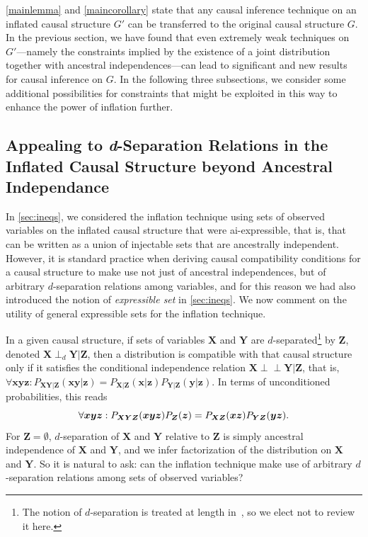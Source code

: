 \documentclass[aps,english,10pt,superscriptaddress,onecolumn,twoside,longbibliography,pra,floatfix,fleqn,nofootinbib]{revtex4-1}
\theoremstyle{definition}
\newcommand{\p}[2][]{{P_{#1}}\parenths{#2}}
\newcommand{\indep}{\perp\!\!\!\!\perp}
\DeclarePairedDelimiter{\parenths}{\lparen}{\rparen}
\begin{document}
\cref{mainlemma} and \cref{maincorollary} state that any causal inference technique on an inflated causal structure $G'$ can be transferred to the original causal structure $G$. In the previous section, we have found that even extremely weak techniques on $G'$---namely the constraints implied by the existence of a joint distribution together with ancestral independences---can lead to significant and new results for causal inference on $G$. In the following three subsections, we consider some additional possibilities for constraints that might be exploited in this way to enhance the power of inflation further.

\subsection{Appealing to \textit{d}-Separation Relations in the Inflated Causal Structure beyond Ancestral Independance}\label{sec:fulldsep}

In \cref{sec:ineqs}, we considered the inflation technique using sets of observed variables on the inflated causal structure that were 
ai-expressible, that is, that can be written as a union of injectable sets that are ancestrally independent.
However, it is standard practice when deriving causal compatibility conditions for a causal structure to make use not just of ancestral independences, but of arbitrary $d$-separation relations among variables, and for this reason we had also introduced the notion of \emph{expressible set} in \cref{sec:ineqs}. We now comment on the utility of general expressible sets for the inflation technique.

In a given causal structure, if sets of variables $\bm{X}$ and $\bm{Y}$ are $d$-separated\footnote{The notion of $d$-separation is treated at length in~\cite{pearl2009causality,studeny2005probabilistic,WoodSpekkens,pusey2014gdag}, so we elect not to review it here.} by $\bm{Z}$, denoted  $\bm{X}\perp_d \bm{Y}|\bm{Z}$, then a distribution is compatible with that causal structure only if it satisfies the conditional independence relation $\bm{X}\indep\bm{Y}|\bm{Z}$, that is,
 $\forall{\bm{x} \bm{y} \bm{z}}: P_{\bm{X}\bm{Y}|\bm{Z}}(\bm{x}\bm{y}|\bm{z})=P_{\bm{X}|\bm{Z}}(\bm{x}|\bm{z})P_{\bm{Y}|\bm{Z}}(\bm{y}|\bm{z})$. In terms of unconditioned probabilities, this reads
\begin{equation}\label{CIuncondprobs}
\forall{\bm{x} \bm{y} \bm{z}}: \p[\bm{X}\bm{Y}\bm{Z}]{\bm{x}\bm{y}\bm{z}}\p[\bm{Z}]{\bm{z}}=\p[\bm{X}\bm{Z}]{\bm{x}\bm{z}}\p[\bm{Y}\bm{Z}]{\bm{y}\bm{z}}.
\end{equation}
For $\bm{Z} = \emptyset$, $d$-separation of $\bm{X}$ and $\bm{Y}$ relative to $\bm{Z}$ is simply ancestral independence of $\bm{X}$ and $\bm{Y}$, and we infer factorization of the distribution on $\bm{X}$ and $\bm{Y}$. So it is natural to ask: can the inflation technique make use of arbitrary $d$-separation relations among sets of observed variables? 
\end{document}
